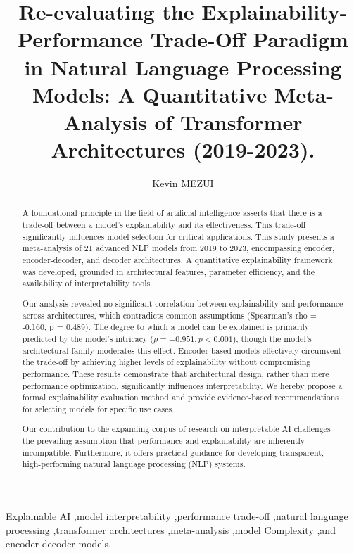 \documentclass[preprint,12pt]{elsarticle}
\begin{document}
\begin{frontmatter}

\title{Re-evaluating the Explainability-Performance Trade-Off Paradigm in Natural Language Processing Models: A Quantitative Meta-Analysis of Transformer Architectures (2019-2023).}

\author[me]{\texorpdfstring{Kevin MEZUI}{Kevin MEZUI}}
\address[me]{Independent Researcher, Paris, France}


\begin{abstract}
A foundational principle in the field of artificial intelligence asserts that there is a trade-off between a model's explainability and its effectiveness. This trade-off significantly influences model selection for critical applications. This study presents a meta-analysis of 21 advanced NLP models from 2019 to 2023, encompassing encoder, encoder-decoder, and decoder architectures. A quantitative explainability framework was developed, grounded in architectural features, parameter efficiency, and the availability of interpretability tools.

Our analysis revealed no significant correlation between explainability and performance across architectures, which contradicts common assumptions (Spearman's rho = -0.160, p = 0.489). The degree to which a model can be explained is primarily predicted by the model's intricacy ($\rho = -0.951, p < 0.001$), though the model's architectural family moderates this effect. Encoder-based models effectively circumvent the trade-off by achieving higher levels of explainability without compromising performance. These results demonstrate that architectural design, rather than mere performance optimization, significantly influences interpretability. We hereby propose a formal explainability evaluation method and provide evidence-based recommendations for selecting models for specific use cases.

Our contribution to the expanding corpus of research on interpretable AI challenges the prevailing assumption that performance and explainability are inherently incompatible. Furthermore, it offers practical guidance for developing transparent, high-performing natural language processing (NLP) systems.
\end{abstract}

\begin{keyword}
Explainable AI \sep model interpretability \sep performance trade-off \sep natural language processing \sep transformer architectures \sep meta-analysis \sep model Complexity \sep and encoder-decoder models.
\end{keyword}

\end{frontmatter}
\linenumbers
\end{document}
